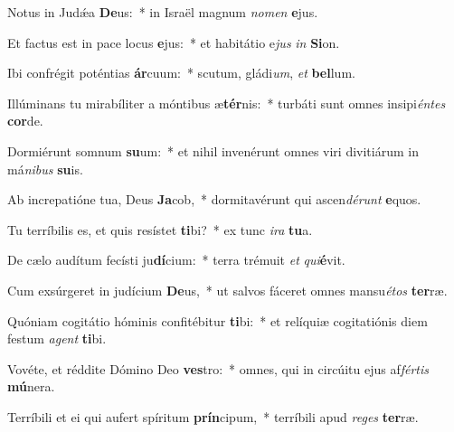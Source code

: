 \item Notus in Judǽa \textbf{De}us:~* in Israël magnum \textit{no}\textit{men} \textbf{e}jus.
\item Et factus est in pace locus \textbf{e}jus:~* et habitátio e\textit{jus} \textit{in} \textbf{Si}on.
\item Ibi confrégit poténtias \textbf{ár}cuum:~* scutum, gládi\textit{um}, \textit{et} \textbf{bel}lum.
\item Illúminans tu mirabíliter a móntibus æ\textbf{tér}nis:~* turbáti sunt omnes insipi\textit{én}\textit{tes} \textbf{cor}de.
\item Dormiérunt somnum \textbf{su}um:~* et nihil invenérunt omnes viri divitiárum in má\textit{ni}\textit{bus} \textbf{su}is.
\item Ab increpatióne tua, Deus \textbf{Ja}cob,~* dormitavérunt qui ascen\textit{dé}\textit{runt} \textbf{e}quos.
\item Tu terríbilis es, et quis resístet \textbf{ti}bi?~* ex tunc \textit{i}\textit{ra} \textbf{tu}a.
\item De cælo audítum fecísti ju\textbf{dí}cium:~* terra trémuit \textit{et} \textit{qui}\textbf{é}vit.
\item Cum exsúrgeret in judícium \textbf{De}us,~* ut salvos fáceret omnes mansu\textit{é}\textit{tos} \textbf{ter}ræ.
\item Quóniam cogitátio hóminis confitébitur \textbf{ti}bi:~* et relíquiæ cogitatiónis diem festum \textit{a}\textit{gent} \textbf{ti}bi.
\item Vovéte, et réddite Dómino Deo \textbf{ves}tro:~* omnes, qui in circúitu ejus af\textit{fér}\textit{tis} \textbf{mú}nera.
\item Terríbili et ei qui aufert spíritum \textbf{prín}cipum,~* terríbili apud \textit{re}\textit{ges} \textbf{ter}ræ.
